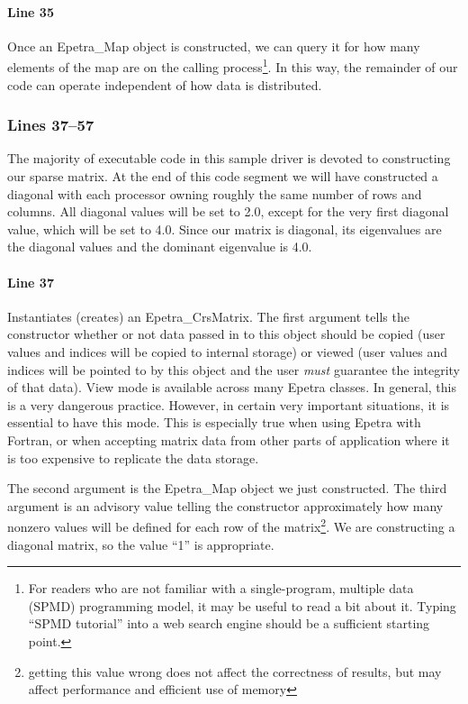 \documentclass[12pt,relax]{EpetraUserGuide}
\newcommand{\map}{Epetra\_Map}
\newcommand{\crsmatrix}{Epetra\_CrsMatrix}
\begin{document}
\paragraph{Line 35}
Once an \map{} object is constructed, we can query it for how many
elements of the map are on the calling process\footnote{For readers
who are not familiar with a single-program, multiple data (SPMD)
programming model, it may be useful to read a bit about it.  Typing
``SPMD tutorial'' into a web search engine should be a sufficient
starting point.}.  In this way, the remainder of our code can operate
independent of how data is distributed.
\subsubsection{Lines 37--57}
The majority of executable code in this sample driver is devoted to
constructing our sparse matrix.  At the end of this code segment we
will have constructed a diagonal with each processor owning roughly
the same number of rows and columns.  All diagonal values will be set
to 2.0, except for the very first diagonal value, which will be set to
4.0.  Since our matrix is diagonal, its eigenvalues are the diagonal
values and the dominant eigenvalue is 4.0.  
\paragraph{Line 37}
Instantiates (creates) an \crsmatrix{}.  The first argument tells the
constructor whether or not data passed in to this object should be
copied (user values and indices will be copied to internal storage) or
viewed (user values and indices will be pointed to by this object and
the user {\it must} guarantee the integrity of that data).  View mode
is available across many Epetra classes.  In general, this is a very
dangerous practice.  However, in certain very important situations, it
is essential to have this mode.  This is especially true when using
Epetra with Fortran, or when accepting matrix data from other parts of
application where it is too expensive to replicate the data storage.

The second argument is the \map{} object we just constructed.  The
third argument is an advisory value telling the constructor
approximately how many nonzero values will be defined for each row of
the matrix\footnote{getting this value wrong does not
affect the correctness of results, but may affect performance and
efficient use of memory}.  We are constructing a diagonal matrix, so the value ``1''
is appropriate.
\end{document}
